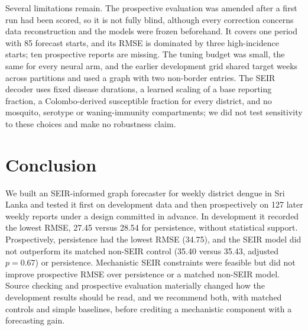 \documentclass[conference]{IEEEtran}
\begin{document}
Several limitations remain.
The prospective evaluation was amended after a first run had been scored, so it is not fully blind, although every correction concerns data reconstruction and the models were frozen beforehand.
It covers one period with 85 forecast starts, and its RMSE is dominated by three high-incidence starts; ten prospective reports are missing.
The tuning budget was small, the same for every neural arm, and the earlier development grid shared target weeks across partitions and used a graph with two non-border entries.
The SEIR decoder uses fixed disease durations, a learned scaling of a base reporting fraction, a Colombo-derived susceptible fraction for every district, and no mosquito, serotype or waning-immunity compartments; we did not test sensitivity to these choices and make no robustness claim.

\section{Conclusion}
We built an SEIR-informed graph forecaster for weekly district dengue in Sri Lanka and tested it first on development data and then prospectively on 127 later weekly reports under a design committed in advance.
In development it recorded the lowest RMSE, 27.45 versus 28.54 for persistence, without statistical support. %
Prospectively, persistence had the lowest RMSE (34.75), and the SEIR model did not outperform its matched non-SEIR control (35.40 versus 35.43, adjusted $p=0.67$) or persistence. %
Mechanistic SEIR constraints were feasible but did not improve prospective RMSE over persistence or a matched non-SEIR model.
Source checking and prospective evaluation materially changed how the development results should be read, and we recommend both, with matched controls and simple baselines, before crediting a mechanistic component with a forecasting gain.



\end{document}
